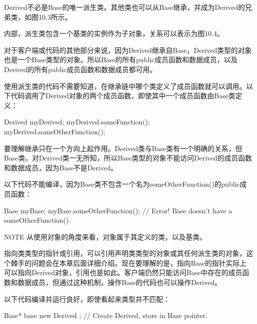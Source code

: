 

Derived不必是Base的唯一派生类。其他类也可以从Base继承，并成为Derived的兄弟类，如图10.3所示。


内部，派生类包含一个基类的实例作为子对象，关系可以表示为图10.4。



对于客户端或代码的其他部分来说，因为Derived继承自Base，Derived类型的对象也是一个Base类型的对象。所以Base的所有public成员函数和数据成员，以及Derived的所有public成员函数和数据成员都可用。

使用派生类的代码不需要知道，在继承链中哪个类定义了成员函数就可以调用。以下代码调用了Derived对象的两个成员函数，即使其中一个成员函数由Base类定义：

\begin{cpp}
Derived myDerived;
myDerived.someFunction();
myDerived.someOtherFunction();
\end{cpp}

要理解继承只在一个方向上起作用。Derived类与Base类有一个明确的关系，但Base类，对Derived类一无所知，所以Base类型的对象不能访问Derived的成员函数和数据成员，因为Base不是Derived。

以下代码不能编译，因为Base类不包含一个名为someOtherFunction()的public成员函数：

\begin{cpp}
Base myBase;
myBase.someOtherFunction(); // Error! Base doesn't have a someOtherFunction().
\end{cpp}

\begin{myNotic}{NOTE}
从使用对象的角度来看，对象属于其定义的类，以及基类。
\end{myNotic}

指向类类型的指针或引用，可以引用声明类类型的对象或其任何派生类的对象，这个棘手的问题会在本章后面详细介绍。现在要理解的是，指向Base的指针实际上可以指向Derived对象，引用也是如此。客户端仍然只能访问Base中存在的成员函数和数据成员，但通过这种机制，操作Base的代码也可以操作Derived。

以下代码编译并运行良好，即使看起来类型并不匹配：

\begin{cpp}
Base* base { new Derived {} }; // Create Derived, store in Base pointer.
\end{cpp}

